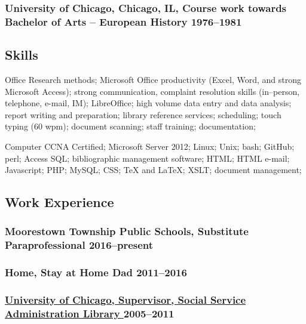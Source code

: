 \documentclass[lettersize,12pt,]{article}
\begin{document}
\subsubsection{ University of Chicago, Chicago, IL, Course work towards Bachelor of Arts -- European History \hfill 1976--1981 }





\subsection{Skills}\label{skills}
\begin{compactdesc}

\item[Office] Research methods; Microsoft Office productivity (Excel, Word, and strong Microsoft Access); strong communication, complaint resolution skills (in--person, telephone, e-mail, IM); LibreOffice; high volume data entry and data analysis; report writing and preparation; library reference services; scheduling; touch typing (60 wpm); document scanning; staff training; documentation; 

\item[Computer] CCNA Certified; Microsoft Server 2012; Linux; Unix; bash; GitHub; perl; Access SQL; bibliographic management software; HTML; HTML e-mail; Javascript; PHP; MySQL; CSS; TeX and LaTeX; XSLT; document management; 

\end{compactdesc}


\subsection{Work Experience}


\subsubsection{ Moorestown Township Public Schools, Substitute Paraprofessional  \hfill 2016--present }





\subsubsection{ Home, Stay at Home Dad  \hfill 2011--2016 }





\subsubsection{ \href{ http://lib.uchicago.edu/e/ssa }{ University of Chicago, Supervisor, Social Service Administration Library }\hfill 2005--2011 }
\end{document}
